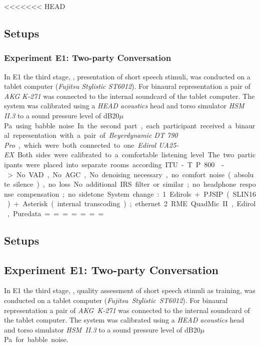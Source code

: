 <<<<<<< HEAD
\subsection{Setups}

\subsubsection{Experiment E1: Two-party Conversation}
In E1 the third stage, \ie, presentation of short speech stimuli, was conducted on a tablet computer (\emph{Fujitsu Stylistic ST6012}).
For binaural representation a pair of \emph{AKG K-271} was connected to the internal soundcard of the tablet computer.
The system was calibrated using a \emph{HEAD acoustics} head and torso simulator \emph{HSM II.3} to a sound pressure level of \unit[75]{dB20$\mu$Pa} using babble noise.
In the second part, each participant received a binaural representation with a pair of \emph{Beyerdynamic DT 790 Pro}, which were both connected to one \emph{Edirol UA25-EX}.
Both sides were calibrated to a comfortable listening level.
The two participants were placed into separate rooms according ITU-T P.800~\citep{itu-t_p.800:_1996}.

-> No VAD, No AGC, No denoising necessary, no comfort noise (absolute silence), no loss
No additional IRS filter or similar; no headphone response compensation; no sidetone.

System change: 
1. Edirols  + PJSIP (SLIN16) + Asterisk (internal transcoding); ethernet
2. RME QuadMic II, Edirol, Puredata  

=======
\subsection{Setups}\label{appendix:laboratorySetups}

\subsection{Experiment E1: Two-party Conversation}
In E1 the third stage, \ie, quality assessment of short speech stimuli as training, was conducted on a tablet computer (\emph{Fujitsu~Stylistic~ST6012}).
For binaural representation a pair of \emph{AKG~K-271} was connected to the internal soundcard of the tablet computer.
The system was calibrated using a \emph{HEAD acoustics} head and torso simulator \emph{HSM~II.3} to a sound pressure level of \unit[75]{dB20$\mu$Pa} for babble noise.

